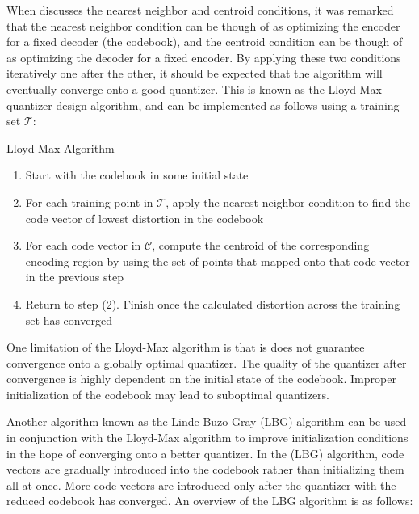 \documentclass[10pt]{article}
\begin{document}
When discusses the nearest neighbor and centroid conditions, it was remarked that the nearest neighbor condition can be though of as optimizing the encoder for a fixed decoder (the codebook), and the centroid condition can be though of as optimizing the decoder for a fixed encoder. By applying these two conditions iteratively one after the other, it should be expected that the algorithm will eventually converge onto a good quantizer. This is known as the Lloyd-Max quantizer design algorithm, and can be implemented as follows using a training set $\mathcal{T}$:

{\sc \noindent Lloyd-Max Algorithm}
\begin{enumerate}
\item Start with the codebook in some initial state
\item For each training point in $\mathcal{T}$, apply the nearest neighbor condition to find the code vector of lowest distortion in the codebook
\item For each code vector in $\mathcal{C}$, compute the centroid of the corresponding encoding region by using the set of points that mapped onto that code vector in the previous step
\item Return to step (2). Finish once the calculated distortion across the training set has converged
\end{enumerate}
One limitation of the Lloyd-Max algorithm is that is does not guarantee convergence onto a globally optimal quantizer. The quality of the quantizer after convergence is highly dependent on the initial state of the codebook. Improper initialization of the codebook may lead to suboptimal quantizers.

Another algorithm known as the Linde-Buzo-Gray (LBG) algorithm can be used in conjunction with the Lloyd-Max algorithm to improve initialization conditions in the hope of converging onto a better quantizer. In the (LBG) algorithm, code vectors are gradually introduced into the codebook rather than initializing them all at once. More code vectors are introduced only after the quantizer with the reduced codebook has converged. An overview of the LBG algorithm is as follows:
\end{document}
